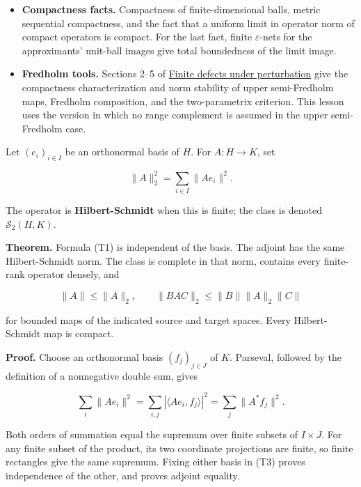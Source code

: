 \documentclass[
  11pt,
]{article}
\begin{document}
\begin{itemize}
  bounded families. These two results and their assumptions are given in
  Section 1 of \href{fredholm-stability.pdf}{Finite defects under
  perturbation}.
\item
  \textbf{Compactness facts.} Compactness of finite-dimensional balls,
  metric sequential compactness, and the fact that a uniform limit in
  operator norm of compact operators is compact. For the last fact,
  finite \(\varepsilon\)-nets for the approximants' unit-ball images
  give total boundedness of the limit image.
\item
  \textbf{Fredholm tools.} Sections 2--5 of
  \href{fredholm-stability.pdf}{Finite defects under perturbation} give
  the compactness characterization and norm stability of upper
  semi-Fredholm maps, Fredholm composition, and the two-parametrix
  criterion. This lesson uses the version in which no range complement
  is assumed in the upper semi-Fredholm case.
\end{itemize}

Let \((e_i)_{i\in I}\) be an orthonormal basis of \(H\). For
\(A:H\to K\), set

\[
\|A\|_2^2=\sum_{i\in I}\|Ae_i\|^2.                            \tag{T1}
\]

The operator is \textbf{Hilbert-Schmidt} when this is finite; the class
is denoted \(\mathcal S_2(H,K)\).

\textbf{Theorem.} Formula (T1) is independent of the basis. The adjoint
has the same Hilbert-Schmidt norm. The class is complete in that norm,
contains every finite-rank operator densely, and

\[
\|A\|\leq\|A\|_2,\qquad
\|BAC\|_2\leq\|B\|\|A\|_2\|C\|                               \tag{T2}
\]

for bounded maps of the indicated source and target spaces. Every
Hilbert-Schmidt map is compact.

\textbf{Proof.} Choose an orthonormal basis \((f_j)_{j\in J}\) of \(K\).
Parseval, followed by the definition of a nonnegative double sum, gives

\[
\sum_i\|Ae_i\|^2
=\sum_{i,j}|\langle Ae_i,f_j\rangle|^2
=\sum_j\|A^*f_j\|^2.                                        \tag{T3}
\]

Both orders of summation equal the supremum over finite subsets of
\(I\times J\). For any finite subset of the product, its two coordinate
projections are finite, so finite rectangles give the same supremum.
Fixing either basis in (T3) proves independence of the other, and proves
adjoint equality.
\end{document}
